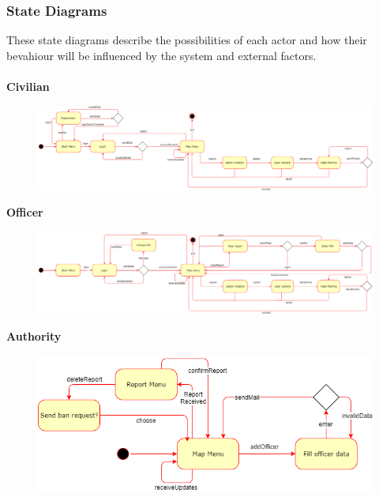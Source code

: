 \documentclass[12pt,a4paper]{article}
\begin{document}
\subsubsection{State Diagrams}
These state diagrams describe the possibilities of each actor and how their bevahiour will be influenced by the system and external factors.\\\\
\textbf{\normalsize{Civilian}}
			\begin{figure}[H]
					\begin{adjustwidth}{-25mm}{-25mm}
					        \includegraphics[width=.9\paperwidth,keepaspectratio]{Images/civilian_states}
					\end{adjustwidth}
			\end{figure}
\textbf{\normalsize{Officer}}
			\begin{figure}[H]
				\centering
				\begin{adjustwidth}{-25mm}{-25mm}
					        \includegraphics[width=.9\paperwidth,keepaspectratio]{Images/officer_states}
					\end{adjustwidth}
			\end{figure}
\textbf{\normalsize{Authority}}
			\begin{figure}[H]
				\centering
				\includegraphics[width=.75\textwidth,keepaspectratio]{Images/authority_states}
			\end{figure}
\end{document}

